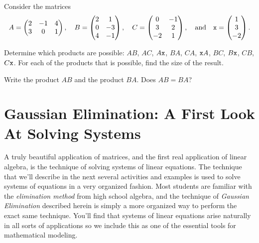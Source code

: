 % 
\begin{problem}
Consider the matrices
\[ A = \begin{pmatrix} 2 & -1 & 4 \\ 3 & 0 & 1 \end{pmatrix}, \quad B = \begin{pmatrix} 2 & 1 \\ 0 & -3 \\ 4 & -1 \end{pmatrix},
    \quad C = \begin{pmatrix} 0 & -1 \\ 3 & 2 \\ -2 & 1 \end{pmatrix}, \quad \text{and} \quad \texttt{x} =
    \begin{pmatrix} 1 \\ 3 \\ -2 \end{pmatrix}. \]
\ba
    \item Determine which products are possible: $AB$, $AC$, $A\texttt{x}$, $BA$,
        $CA$, $\texttt{x} A$, $BC$, $B\texttt{x}$, $CB$, $C\texttt{x}$. For
        each of the products that is possible, find the size of the result.
    \item Write the product $AB$ and the product $BA$.  Does $AB = BA$?
\ea
\end{problem}

\section{Gaussian Elimination: A First Look At Solving Systems}
A truly beautiful application of matrices, and the first real application of linear
algebra, is the technique of solving systems of linear equations.  The technique that
we'll describe in the next several activities and examples is used to solve systems of
equations in a very organized fashion.  Most students are familiar with the {\it
elimination method} from high school algebra, and the technique of {\it Gaussian
Elimination} described herein is simply a more organized way to perform the exact same
technique.  You'll find that systems of linear equations arise naturally in all sorts of
applications so we include this as one of the essential tools for mathematical modeling.


